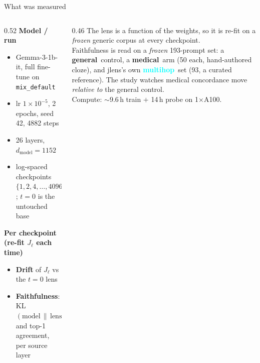 \documentclass[aspectratio=169,11pt]{beamer}
\newcommand{\gen}{\textcolor{genblue}{\textbf{general}}}
\newcommand{\med}{\textcolor{medorange}{\textbf{medical}}}
\newcommand{\mh}{\textcolor{aqua}{\textbf{multihop}}}
\begin{document}
\begin{frame}{What was measured}
  \begin{columns}[T]
    \begin{column}{0.52\textwidth}
      \textbf{Model / run}
      \begin{itemize}\setlength\itemsep{0.3em}
        \item Gemma-3-1b-it, full fine-tune on \texttt{mix\_default}
        \item lr $1\!\times\!10^{-5}$, 2 epochs, seed 42, 4882 steps
        \item 26 layers, $d_{\text{model}}{=}1152$
        \item log-spaced checkpoints $\{1,2,4,\dots,4096,4882\}$;
              $t{=}0$ is the untouched base
      \end{itemize}
      \vspace{0.6em}
      \textbf{Per checkpoint (re-fit $J_\ell$ each time)}
      \begin{itemize}\setlength\itemsep{0.3em}
        \item \textbf{Drift} of $J_\ell$ vs the $t{=}0$ lens
        \item \textbf{Faithfulness}: KL$(\text{model}\,\|\,\text{lens})$
              and top-1 agreement, per source layer
      \end{itemize}
    \end{column}
    \begin{column}{0.46\textwidth}
      \small\color{muted}
      The lens is a function of the weights, so it is re-fit on a
      \emph{frozen} generic corpus at every checkpoint.\\[0.6em]
      Faithfulness is read on a \emph{frozen} 193-prompt set: a \gen\ control,
      a \med\ arm (50 each, hand-authored cloze), and jlens's own \mh\ set (93,
      a curated reference). The study watches medical concordance move
      \emph{relative to} the general control.\\[0.6em]
      Compute: $\sim$9.6\,h train $+$ 14\,h probe on 1$\times$A100.
    \end{column}
  \end{columns}
\end{frame}
\end{document}
